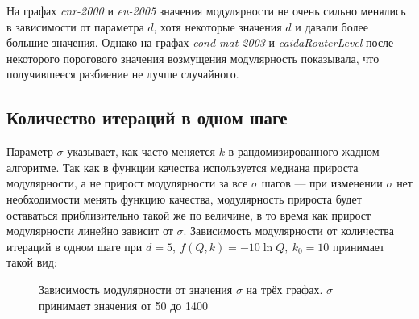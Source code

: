 На графах \emph{cnr-2000} и \emph{eu-2005} значения модулярности не очень сильно менялись в зависимости от параметра $d$, хотя некоторые значения $d$ и давали более большие значения. Однако на графах \emph{cond-mat-2003} и \emph{caidaRouterLevel} после некоторого порогового значения возмущения модулярность показывала, что получившееся разбиение не лучше случайного.



\subsection{Количество итераций в одном шаге}

Параметр $\sigma$ указывает, как часто меняется $k$ в рандомизированного жадном алгоритме. Так как в функции качества используется медиана прироста модулярности, а не прирост модулярности за все $\sigma$ шагов --- при изменении $\sigma$ нет необходимости менять функцию качества, модулярность прироста будет оставаться приблизительно такой же по величине, в то время как прирост модулярности линейно зависит от $\sigma$. Зависимость модулярности от количества итераций в одном шаге при $d = 5,\ f(Q, k) = -10 \ln Q,\ k_0 = 10$ принимает такой вид:

\begin{figure}[H]
	\columnwidth
	\columnwidth
	\caption{Зависимость модулярности от значения $\sigma$ на трёх графах. $\sigma$ принимает значения от 50 до 1400}
\end{figure}

